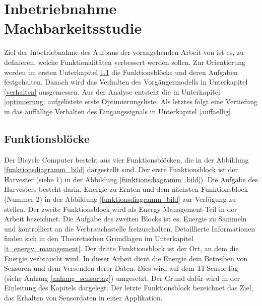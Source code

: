  
\section{Inbetriebnahme Machbarkeitsstudie}\label{v_inbetriebnahme} 

      
Ziel der Inbetriebnahme des Aufbaus der vorangehenden Arbeit von \cite{PA_bicycle} ist es, zu definieren, welche Funktionalitäten verbessert werden sollen. Zur Orientierung werden im ersten Unterkapitel \ref{fb} die Funktionsblöcke und deren Aufgaben festgehalten. Danach wird das Verhalten des Vorgängermodells in Unterkapitel \ref{verhalten} ausgemessen. Aus der Analyse entsteht die in Unterkapitel \ref{optimierung} aufgelistete erste Optimierungsliste. Als letztes folgt eine Vertiefung in das auffällige Verhalten des Eingangssignals in Unterkapitel \ref{auffaellig}.
      
\subsection{Funktionsblöcke}\label{fb} 

Der Bicycle Computer besteht aus vier Funktionsblöcken, die in der Abbildung \ref{funktionsdiagramm_bild} dargestellt sind. Der erste Funktionsblock ist der Harvester (siehe 1) in der Abbildung \ref{funktionsdiagramm_bild}). Die Aufgabe des Harvesters besteht darin, Energie zu Ernten und dem nächsten Funktionsblock (Nummer 2) in der Abbildung  \ref{funktionsdiagramm_bild} zur Verfügung zu stellen. Der zweite Funktionsblock wird als Energy Management-Teil in der Arbeit bezeichnet. Die Aufgabe des zweiten Blocks ist es, Energie zu Sammeln und kontrolliert an die Verbrauchsstelle freizuschalten. Detaillierte Informationen finden sich in den Theoretischen Grundlagen im Unterkapitel \ref{t_energy_management}. Der dritte Funktionsblock ist der Ort, an dem die Energie verbraucht wird. In dieser Arbeit dient die Energie dem Betreiben von Sensoren und dem Versenden derer Daten. Dies wird auf dem TI-SensorTag (siehe Anhang \ref{anhang_sensortag}) umgesetzt. Der Grund dafür wird in der Einleitung des Kapitels \label{t_power_management} dargelegt. Der letzte Funktionsblock bezeichnet das Ziel, das Erhalten von Sensordaten in einer Applikation.  


